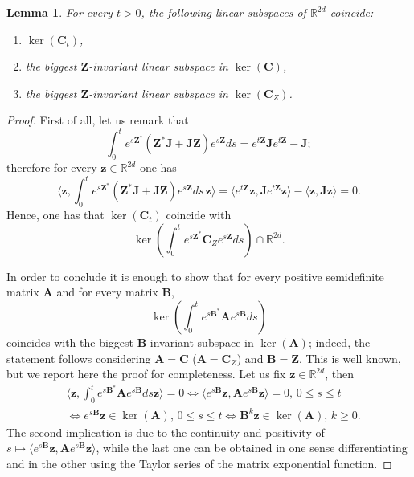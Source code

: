 \documentclass[preprint]{elsarticle}
\newtheorem{lemma}[defi]{Lemma}
\theoremstyle{definition}
\def\RR{\mathbb{R}}
\begin{document}
\begin{lemma} \label{lem:kerct}
For every $t >0$, the following linear subspaces of $\RR^{2d}$ coincide:
\begin{enumerate}
    \item $\ker(\mathbf{C}_t)$,
    \item the biggest $\mathbf{Z}$-invariant linear subspace in $\ker(\mathbf{C})$,
    \item the biggest $\mathbf{Z}$-invariant linear subspace in $\ker(\mathbf{C}_{Z})$.
\end{enumerate}
\end{lemma}
\begin{proof}
First of all, let us remark that
$$\int_0^t e^{s\mathbf{Z}^*}(\mathbf{Z}^*\mathbf{J} + \mathbf{J}\mathbf{Z})e^{s \mathbf{Z}}ds=e^{t\mathbf{Z}} \mathbf{J} e^{t\mathbf{Z}}-\mathbf{J};$$
therefore for every $\mathbf{z}
\in \RR^{2d}$ one has
$$\langle \mathbf{z}, \int_0^t e^{s\mathbf{Z}^*}(\mathbf{Z}^*\mathbf{J} + \mathbf{J}\mathbf{Z})e^{s \mathbf{Z}}ds \,\mathbf{z} \rangle=\langle e^{t \mathbf{Z}}\mathbf{z}, \mathbf{J} e^{t\mathbf{Z}}\mathbf{z} \rangle -\langle \mathbf{z}, \mathbf{J} \mathbf{z} \rangle=0.$$
Hence, one has that $\ker(\mathbf{C}_t)$ coincide with
$$\ker \left ( \int_0^t e^{s\mathbf{Z}^*}\mathbf{C}_{Z}e^{s \mathbf{Z}}ds\right )\cap \RR^{2d}.$$

In order to conclude it is enough to show that for every positive semidefinite matrix $\mathbf{A}$ and for every matrix $\mathbf{B}$,
$$\ker\left ( \int_0^t e^{s\mathbf{B}^*} \mathbf{A} e^{s \mathbf{B}}ds \right )$$
coincides with the biggest $\mathbf{B}$-invariant subspace in $\ker(\mathbf{A})$; indeed, the statement follows considering $\mathbf{A}=\mathbf{C}$ ($\mathbf{A}=\mathbf{C}_Z$) and $\mathbf{B}=\mathbf{Z}$. This is well known, but we report here the proof for completeness. Let us fix $\mathbf{z} \in \RR^{2d}$, then
\begin{align*}&\langle \mathbf{z},\int_0^t e^{s\mathbf{B}^*} \mathbf{A} e^{s \mathbf{B}}ds \mathbf{z} \rangle=0 \Leftrightarrow  \langle e^{s \mathbf{B}} \mathbf{z},  \mathbf{A} e^{s \mathbf{B}}\mathbf{z} \rangle=0, \, 0\leq s \leq t\\
&\Leftrightarrow e^{s\mathbf{B}} \mathbf{z} \in \ker(\mathbf{A}), \, 0 \leq s \leq t \Leftrightarrow \mathbf{B}^k \mathbf{z} \in \ker(\mathbf{A}), \, k \geq 0.\end{align*}
The second implication is due to the continuity and positivity of $s \mapsto \langle e^{s \mathbf{B}} \mathbf{z},  \mathbf{A} e^{s \mathbf{B}}\mathbf{z} \rangle$, while the last one can be obtained in one sense differentiating and in the other using the Taylor series of the matrix exponential function.
\end{proof}
\end{document}
